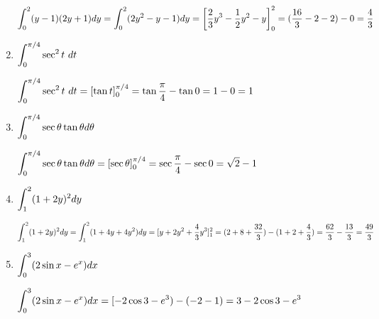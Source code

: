 \begin{enumerate}[1.]
\begin{Solution}
  $\displaystyle \int_0^2 (y - 1)(2y + 1) dy = \int_0^2 (2y^2 - y - 1) dy =
    \left[ \frac{2}{3} y^3 - \frac{1}{2} y^2 - y \right]_0^2 = 
    ( \frac{16}{3} - 2 - 2) - 0 = \frac{4}{3}$
\end{Solution}

\item \begin{Question}
    
  $\displaystyle \int_0^{\pi / 4} \sec^2 t ~dt$
\end{Question}

\begin{Solution}
    
  $\displaystyle \int_0^{\pi / 4} \sec^2 t ~dt = [\tan t]_0^{\pi / 4} =
    \tan \frac{\pi}{4} - \tan 0 = 1 - 0 = 1$
    
\end{Solution}

\item \begin{Question}
    
  $\displaystyle \int_0^{\pi / 4} \sec \theta \tan \theta d \theta$
\end{Question}

\begin{Solution}
  $\displaystyle \int_0^{\pi / 4} \sec \theta \tan \theta d \theta = 
    [ \sec \theta ]_0^{\pi / 4} = 
    \sec \frac{\pi}{4} - \sec 0 = \sqrt{2} - 1$
\end{Solution}

\item \begin{Question}
    
  $\displaystyle \int_1^2 (1 + 2y)^2 dy$
\end{Question}

\begin{Solution}
  $\displaystyle \int_1^2 (1 + 2y)^2 dy = 
    \int_1^2 (1 + 4y + 4y^2) dy =
    [y + 2y^2 + \frac{4}{3} y^3]_1^2 =
    (2 + 8 + \frac{32}{3}) - (1 + 2 + \frac{4}{3}) = 
    \frac{62}{3} - \frac{13}{3} = \frac{49}{3}$
\end{Solution}

\item \begin{Question}
    
  $\displaystyle \int_0^3 (2 \sin x - e^x) dx$
\end{Question}

\begin{Solution}
  $\displaystyle \int_0^3 (2 \sin x - e^x) dx = 
    [-2 \cos 3 - e^3) - (-2 - 1) =
    3 - 2 \cos 3 - e^3$
    

\end{Solution}
\end{enumerate}
